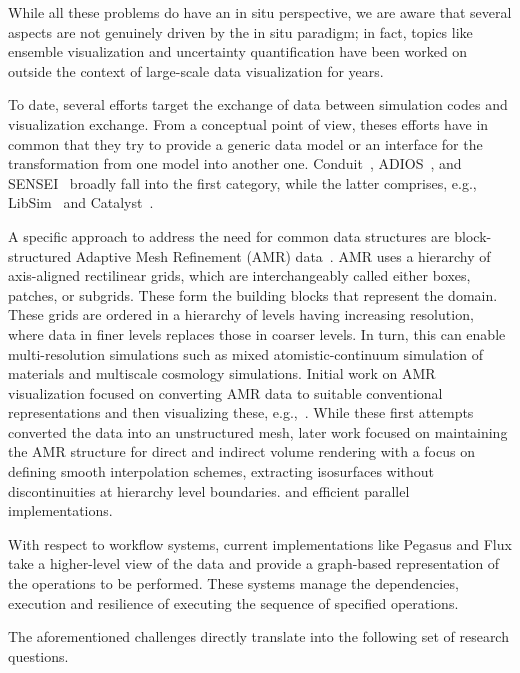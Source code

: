 \begin{refsection}
While all these problems do have an in situ perspective, we are aware that several aspects are not genuinely driven by the in situ paradigm; in fact, topics like ensemble visualization and uncertainty quantification have been worked on outside the context of large-scale data visualization for years.

To date, several efforts target the exchange of data between simulation codes and visualization exchange.
From a conceptual point of view, theses efforts have in common that they try to provide a generic data model or an interface for the transformation from one model into another one.
Conduit~\cite{Larsen17}, ADIOS~\cite{Lofstead08}, and SENSEI~\cite{Ayachit16} broadly fall into the first category, while the latter comprises, e.g., LibSim~\cite{Whitlock11} and Catalyst~\cite{Fabian11}.

A specific approach to address the need for common data structures are block-structured Adaptive Mesh Refinement (AMR) data~\cite{Berger89}.
AMR uses a hierarchy of axis-aligned rectilinear grids, which are interchangeably called either boxes, patches, or subgrids. 
These form the building blocks that represent the domain. These grids are ordered in a hierarchy of levels having increasing resolution, where data in finer levels replaces those in coarser levels. 
In turn, this can enable multi-resolution simulations such  as mixed atomistic-continuum simulation of materials and multiscale cosmology
simulations.
Initial work on AMR visualization focused on converting AMR data to suitable conventional representations and then visualizing these, e.g.,~\cite{Norman99}.
While these first attempts converted the data into an unstructured mesh, later work focused on maintaining the AMR structure for direct and indirect volume rendering \cite{Wang19,Wald17,Weber12} with a focus on defining smooth interpolation schemes, extracting isosurfaces without discontinuities at hierarchy level boundaries. and efficient parallel implementations.

With respect to workflow systems, current implementations like Pegasus and Flux take a higher-level view of the data and provide a graph-based representation of the operations to be performed. These systems manage the dependencies, execution and resilience of executing the sequence of specified operations.

The aforementioned challenges directly translate into the following set of research questions.


\end{refsection}
